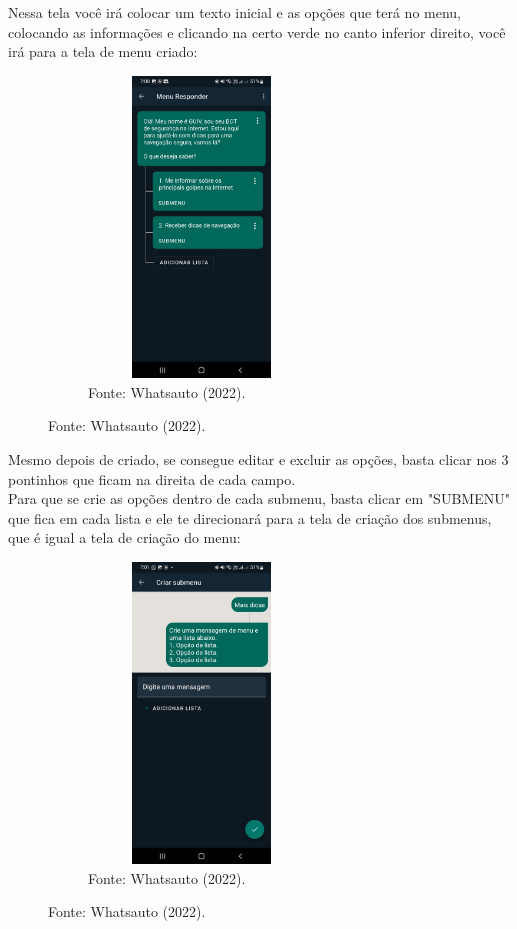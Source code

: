 \begin{itemize}
        Nessa tela você irá colocar um texto inicial e as opções que terá no menu, colocando as informações e clicando na certo verde no canto inferior direito, você irá para a tela de menu criado:

\begin{figure}[!htb]
\centering
\captionsetup[subfigure]{labelformat=empty}
\caption{``Menu 3''}
\begin{subfigure}{.5\textwidth}
\centering
\includegraphics[width=6cm,height=8cm]{Bot/Partes/Imagens/Menu 3.jpeg}
\caption{Fonte: Whatsauto (2022).}
\end{subfigure}%
\end{figure}

        Mesmo depois de criado, se consegue editar e excluir as opções, basta clicar nos 3 pontinhos que ficam na direita de cada campo. \\

        Para que se crie as opções dentro de cada submenu, basta clicar em "SUBMENU" que fica em cada lista e ele te direcionará para a tela de criação dos submenus, que é igual a tela de criação do menu:

\begin{figure}[!htb]
\centering
\captionsetup[subfigure]{labelformat=empty}
\caption{``Submenu 1''}
\begin{subfigure}{.5\textwidth}
\centering
\includegraphics[width=6cm,height=8cm]{Bot/Partes/Imagens/Submenu 1.jpeg}
\caption{Fonte: Whatsauto (2022).}
\end{subfigure}%
\end{figure}



\end{itemize}
